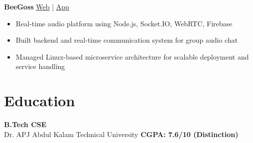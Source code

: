 \documentclass[letterpaper,11pt]{article}
\begin{document}
\textbf{BeeGoss} \hfill \href{https://beegoss.knobee.app/}{Web} \;|\; \href{https://play.google.com/store/apps/details?id=com.beegoss&hl=en_IN}{App}
\begin{itemize}
\item Real-time audio platform using Node.js, Socket.IO, WebRTC, Firebase
\item Built backend and real-time communication system for group audio chat
\item Managed Linux-based microservice architecture for scalable deployment and service handling
\end{itemize}

\section{Education}
\textbf{B.Tech CSE} \\
Dr. APJ Abdul Kalam Technical University \hfill \textbf{CGPA: 7.6/10 (Distinction)}
\end{document}

